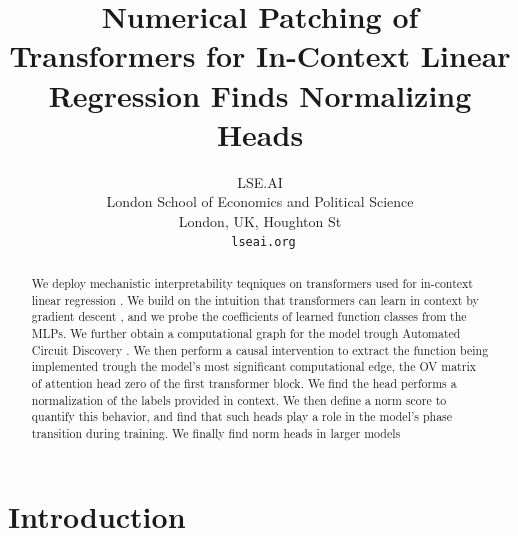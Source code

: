 \documentclass{article}
\title{Numerical Patching of Transformers for In-Context Linear Regression Finds Normalizing Heads}
\author{%
  LSE.AI\\
  London School of Economics and Political Science\\
  London, UK, Houghton St\\\
  \texttt{lseai.org} \\
}
\begin{document}
\maketitle


\begin{abstract}
  We deploy mechanistic interpretability teqniques on transformers used for in-context linear regression \citep{garg_2023_what}. We build on the intuition that transformers can learn in context by gradient descent \citep{vonoswald_2023_transformers}, and we probe the coefficients of learned function classes from the MLPs. We further obtain a computational graph for the model trough Automated Circuit Discovery \citep{conmy_2023_towards}. We then perform a causal intervention to extract the function being implemented trough the model's most significant computational edge, the OV matrix of attention head zero of the first transformer block. We find the head performs a normalization of the labels provided in context. We then define a norm score to quantify this behavior, and find that such heads play a role in the model's phase transition during training. We finally find norm heads in larger models
\end{abstract}


\section{Introduction}
\end{document}
